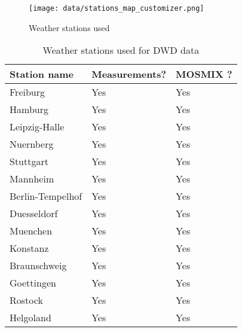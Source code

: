 \documentclass[class=scrbook, crop=false]{standalone}
\begin{document}
\begin{figure}[ht]
            \centering
            \texttt{[image: data/stations\_map\_customizer.png]}
            \caption[Weather stations used]{Weather stations used}
            \label{fig::weather_stations}
 \end{figure}
 

\begin{table}[]
\centering
\begin{tabular}{l|l|l}
Station name & Measurements? & MOSMIX ?\\\hline
   Freiburg&Yes&Yes\\
   Hamburg&Yes&Yes\\
    Leipzig-Halle&Yes&Yes\\
    Nuernberg&Yes&Yes\\
    Stuttgart&Yes&Yes\\
    Mannheim&Yes&Yes\\
    Berlin-Tempelhof&Yes&Yes\\
    Duesseldorf&Yes&Yes\\
    Muenchen&Yes&Yes\\
   Konstanz&Yes&Yes\\
   Braunschweig&Yes&Yes\\
   Goettingen&Yes&Yes\\
   Rostock&Yes&Yes\\
   Helgoland&Yes&Yes   
\end{tabular}
\caption{Weather stations used for DWD data}
\label{Table::Weather_Stations}
\end{table}



 
 



\end{document}
